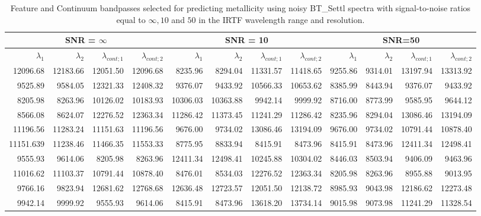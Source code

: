 \begin{table*}
\begin{center}
\begin{tabular}{ rrrr | rrrr | rrrr }
  \hline
  \multicolumn{4}{c}{SNR = $\infty$ } & \multicolumn{4}{c}{SNR = 10} &  \multicolumn{4}{c}{SNR=50} \\
  \hline
$\lambda_1$ & $\lambda_2$ & $\lambda_{cont;1}$ & $\lambda_{cont;2} $ & $\lambda_1$ & $\lambda_2$ & $\lambda_{cont;1}$ & $\lambda_{cont;2} $ & $\lambda_1$ & $\lambda_2$ & $\lambda_{cont;1}$ & $\lambda_{cont;2} $ \\ 
  \hline

     12096.68 & 12183.66  & 12051.50 & 12096.68 & 8235.96  & 8294.04  &	11331.57 & 11418.65 & 9255.86 & 9314.01   &     13197.94 & 13313.92  \\
    9525.89 & 9584.05 	  & 12321.33 & 12408.32 & 9376.07  & 9433.92  &	10566.33 & 10653.62 & 8385.99 & 8443.94   &     9376.07  & 9433.92    \\
     8205.98 & 8263.96 	  & 10126.02 & 10183.93 & 10306.03 & 10363.88 &	 9942.14 & 9999.92  & 8716.00 & 8773.99   &     9585.95  & 9644.12    \\
     8566.08 & 8624.07 	  & 12276.52 & 12363.34 & 11286.42 & 11373.45 &	11241.29 & 11286.42 & 8235.96 & 8294.04   &     13086.46 & 13194.09  \\
     11196.56 & 11283.24  & 11151.63 & 11196.56 & 9676.00  & 9734.02  &	13086.46 & 13194.09 & 9676.00 & 9734.02   &     10791.44 & 10878.40  \\
     11151.639 & 11238.46 & 11466.35 & 11553.33 & 8775.95  & 8833.94  &	8415.91  & 8473.96  & 8415.91 & 8473.96   &     12411.34 & 12498.41  \\
     9555.93 & 9614.06 	  & 8205.98  & 8263.96  & 12411.34 & 12498.41 &	10245.88 & 10304.02 & 8446.03 & 8503.94   &     9406.09  & 9463.96    \\
     11016.62 & 11103.37  & 10791.44 & 10878.40 & 8476.01  & 8534.03  &	12276.52 & 12363.34 & 8205.98 & 8263.96   &     8955.88  & 9013.95    \\
     9766.16 & 9823.94 	  & 12681.62 & 12768.68 & 12636.48 & 12723.57 &	12051.50 & 12138.72 & 8985.93 & 9043.98   &     12186.62 & 12273.48  \\
     9942.14 & 9999.92    & 9555.93  & 9614.06  & 8415.91  & 8473.96  &	13618.20 & 13734.14 & 9015.98 & 9073.98   &     11241.29 & 11328.54  \\

\hline
\end{tabular}
\caption {Feature and Continuum bandpasses selected for predicting metallicity 
      using noisy BT\_Settl spectra with signal-to-noise ratios
      equal to $\infty , 10 $ and $ 50 $ in the IRTF wavelength range
  and resolution.} \label{tab:irtf-met-noisy}
\end{center}
\end{table*}


